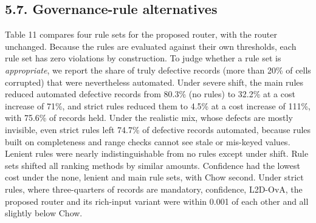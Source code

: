 \documentclass[
  11pt,
]{article}
\begin{document}
\hypertarget{governance-rule-alternatives}{%
\subsection{5.7. Governance-rule
alternatives}\label{governance-rule-alternatives}}

Table 11 compares four rule sets for the proposed router, with the
router unchanged. Because the rules are evaluated against their own
thresholds, each rule set has zero violations by construction. To judge
whether a rule set is \emph{appropriate}, we report the share of truly
defective records (more than 20\% of cells corrupted) that were
nevertheless automated. Under severe shift, the main rules reduced
automated defective records from 80.3\% (no rules) to 32.2\% at a cost
increase of 71\%, and strict rules reduced them to 4.5\% at a cost
increase of 111\%, with 75.6\% of records held. Under the realistic mix,
whose defects are mostly invisible, even strict rules left 74.7\% of
defective records automated, because rules built on completeness and
range checks cannot see stale or mis-keyed values. Lenient rules were
nearly indistinguishable from no rules except under shift. Rule sets
shifted all ranking methods by similar amounts. Confidence had the
lowest cost under the none, lenient and main rule sets, with Chow
second. Under strict rules, where three-quarters of records are
mandatory, confidence, L2D-OvA, the proposed router and its rich-input
variant were within 0.001 of each other and all slightly below Chow.
\end{document}
